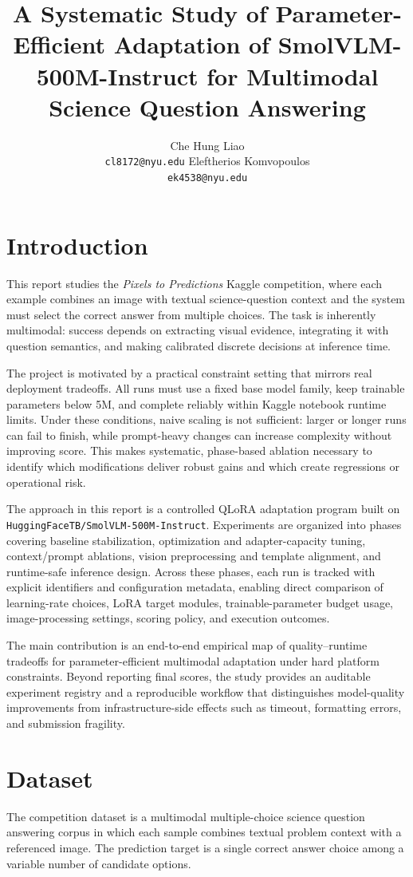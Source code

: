 \documentclass[11pt]{article}
\title{A Systematic Study of Parameter-Efficient Adaptation of SmolVLM-500M-Instruct for Multimodal Science Question Answering}
\author{
  Che Hung Liao \\
  \texttt{cl8172@nyu.edu}
  \And
  Eleftherios Komvopoulos \\
  \texttt{ek4538@nyu.edu}
}
\begin{document}
\maketitle

\section{Introduction}
This report studies the \textit{Pixels to Predictions} Kaggle competition, where each example combines an image with textual science-question context and the system must select the correct answer from multiple choices. The task is inherently multimodal: success depends on extracting visual evidence, integrating it with question semantics, and making calibrated discrete decisions at inference time.

The project is motivated by a practical constraint setting that mirrors real deployment tradeoffs. All runs must use a fixed base model family, keep trainable parameters below 5M, and complete reliably within Kaggle notebook runtime limits. Under these conditions, naive scaling is not sufficient: larger or longer runs can fail to finish, while prompt-heavy changes can increase complexity without improving score. This makes systematic, phase-based ablation necessary to identify which modifications deliver robust gains and which create regressions or operational risk.

The approach in this report is a controlled QLoRA adaptation program built on \texttt{HuggingFaceTB/SmolVLM-500M-Instruct}. Experiments are organized into phases covering baseline stabilization, optimization and adapter-capacity tuning, context/prompt ablations, vision preprocessing and template alignment, and runtime-safe inference design. Across these phases, each run is tracked with explicit identifiers and configuration metadata, enabling direct comparison of learning-rate choices, LoRA target modules, trainable-parameter budget usage, image-processing settings, scoring policy, and execution outcomes.

The main contribution is an end-to-end empirical map of quality--runtime tradeoffs for parameter-efficient multimodal adaptation under hard platform constraints. Beyond reporting final scores, the study provides an auditable experiment registry and a reproducible workflow that distinguishes model-quality improvements from infrastructure-side effects such as timeout, formatting errors, and submission fragility.

\section{Dataset}
The competition dataset is a multimodal multiple-choice science question answering corpus in which each sample combines textual problem context with a referenced image. The prediction target is a single correct answer choice among a variable number of candidate options.
\end{document}

